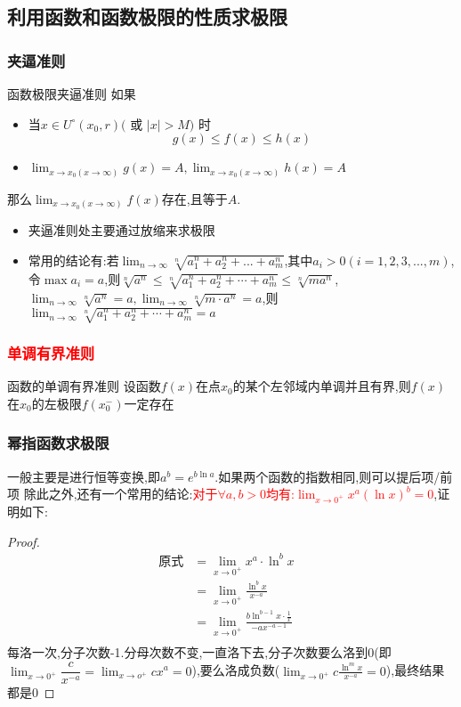 \documentclass[9pt a4paper, oneside, UTF8]{ctexbook}
\begin{document}
\begin{sloppypar}
    \subsection{利用函数和函数极限的性质求极限}
    \subsubsection{夹逼准则}
    \begin{defn}{函数极限夹逼准则}{}
        如果
        \begin{itemize}
            \item 当$x\in U^{\circ}(x_{0},r)($ 或 $|x|>M)$ 时
                  $$
                      g(x)\leqslant f(x) \leqslant h(x)
                  $$
            \item $\lim_{x\to x_0(x\to\infty)}g(x)=A,\lim_{x\to x_0(x\to\infty)}h(x)=A$
        \end{itemize}
        那么$\lim_{x\to x_0(x\to\infty)}f(x)$存在,且等于$A$.
    \end{defn}
    \begin{itemize}
        \item 夹逼准则处主要通过放缩来求极限
        \item 常用的结论有:若$\lim _{n \to \infty} \sqrt[n]{a_1^n+a_2^n+...+a_m^n}$,其中$a_i >0(i=1,2,3,...,m)$,令$\max{a_i}=a$,则$\sqrt[n]{a^n}\leqslant\sqrt[n]{a_1^n+a_2^n+\cdots+a_m^n}\leqslant\sqrt[n]{ma^n}$,\\$\lim_{n\to\infty}\sqrt[n]{a^n}=a,\lim_{n\to\infty}\sqrt[n]{m\cdot a^n}=a$,则$\operatorname*{lim}_{n\to\infty}\sqrt[n]{a_1^n+a_2^n+\cdots+a_m^n}=a$
    \end{itemize}
    \subsubsection{\textcolor{red}{单调有界准则}}
    \begin{defn}{函数的单调有界准则}{}
        设函数$f(x)$在点$x_0$的某个左邻域内单调并且有界,则$f(x)$在$x_0$的左极限$f(x_0^-)$一定存在
    \end{defn} 
    \subsubsection{幂指函数求极限}
    一般主要是进行恒等变换,即$a^b=e^{b\ln a}$.如果两个函数的指数相同,则可以提后项/前项
    除此之外,还有一个常用的结论:\textcolor{red}{对于$\forall a,b>0$均有:$\lim_{x\to 0^+}x^a(\ln x)^b=0$},证明如下:
    \begin{proof}
        \begin{align*}
            \text{原式} & = \lim_{x\to0^{+}}x^{a}\cdot\ln^{b}x & \\
             & = \lim_{x\to0^{+}}\frac{\ln^{b}x}{x^{-a}} &\\
             & =\lim_{x\to0^{+}}\frac{b\ln^{b-1}x\cdot\frac{1}{x}}{-ax^{-a-1}}&\\
        \end{align*}
    每洛一次,分子次数-1.分母次数不变,一直洛下去,分子次数要么洛到0(即$\lim_{x\to 0^+}\dfrac{c}{x^{-a}}=\lim_{x\to o^+} cx^a=0$),要么洛成负数($\lim_{x\to 0^+ }c\frac{\ln^m x}{x^{-a}}=0$),最终结果都是0
    \end{proof}
    

\end{sloppypar}
\end{document}
